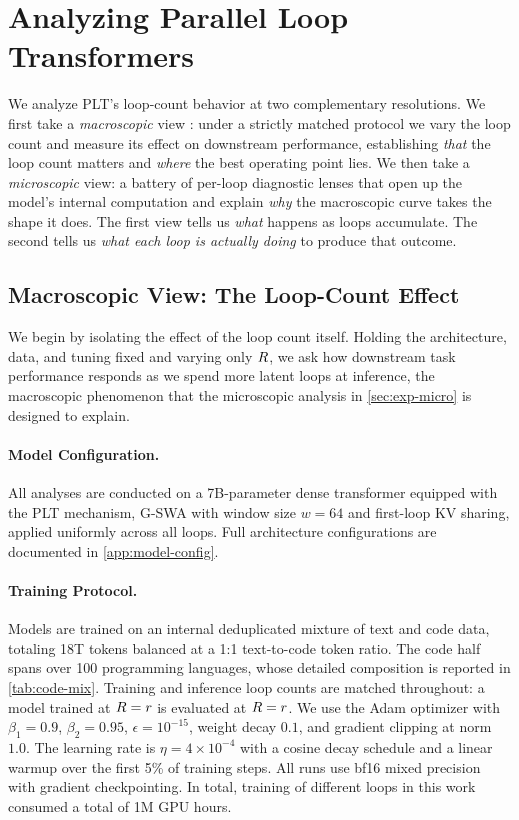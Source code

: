 \section{Analyzing Parallel Loop Transformers}
\label{sec:experiments}

We analyze PLT's loop-count behavior at two complementary resolutions.
We first take a \emph{macroscopic} view : under a
strictly matched protocol we vary the loop count and measure its effect on
downstream performance, establishing \emph{that} the loop count matters and
\emph{where} the best operating point lies.
We then take a \emph{microscopic} view: a battery
of per-loop diagnostic lenses that open up the model's internal computation and
explain \emph{why} the macroscopic curve takes the shape it does.
The first view tells us \emph{what} happens as loops accumulate. The second
tells us \emph{what each loop is actually doing} to produce that outcome.

\subsection{Macroscopic View: The Loop-Count Effect}
\label{sec:exp-macro}

We begin by isolating the effect of the loop count itself.
Holding the architecture, data, and tuning fixed and varying only
$R$, we ask how downstream task performance responds as we spend more
latent loops at inference, the macroscopic phenomenon that the microscopic
analysis in \autoref{sec:exp-micro} is designed to explain.

\paragraph{Model Configuration.}
\label{sec:exp-arch}

All analyses are conducted on a 7B-parameter dense transformer
equipped with the PLT mechanism, G-SWA with window size $w = 64$ and
first-loop KV sharing, applied uniformly across all loops.
Full architecture configurations are documented in
\autoref{app:model-config}.

\paragraph{Training Protocol.}
\label{sec:exp-train}

Models are trained on an internal deduplicated mixture of text and code
data, totaling 18T tokens balanced at a 1:1 text-to-code token ratio. The
code half spans over 100 programming languages, whose detailed composition is
reported in \autoref{tab:code-mix}.
Training and inference loop counts are matched throughout: a model
trained at $R = r$ is evaluated at $R = r$.
We use the Adam optimizer with $\beta_1 = 0.9$, $\beta_2 = 0.95$,
$\epsilon = 10^{-15}$, weight decay $0.1$, and gradient clipping at
norm $1.0$.
The learning rate is $\eta = 4 \times 10^{-4}$ with a cosine decay
schedule and a linear warmup over the first 5\% of training steps.
All runs use bf16 mixed precision with gradient checkpointing.
In total, training \modelname{} of different loops in this work consumed a total of 1M GPU hours.


